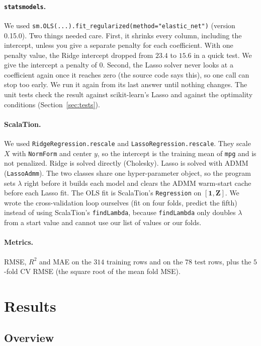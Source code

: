 \documentclass[11pt]{article}
\begin{document}
\paragraph{\texttt{statsmodels}.} We used \texttt{sm.OLS(...).fit\_regularized(method="elastic\_net")} (version 0.15.0). Two
things needed care. First, it shrinks every column, including the intercept, unless you give a separate penalty for each
coefficient. With one penalty value, the Ridge intercept dropped from $23.4$ to $15.6$ in a quick test. We give the intercept a penalty
of $0$. Second, the Lasso solver never looks at a coefficient again once it reaches zero (the source code says this), so one
call can stop too early. We run it again from its last answer until nothing changes. The unit tests check the result against
scikit-learn's Lasso and against the optimality conditions (Section~\ref{sec:tests}).

\paragraph{ScalaTion.} We used \texttt{RidgeRegression.rescale} and \texttt{LassoRegression.rescale}. They scale $X$ with
\texttt{NormForm} and center $y$, so the intercept is the training mean of \texttt{mpg} and is not penalized. Ridge is solved
directly (Cholesky). Lasso is solved with ADMM (\texttt{LassoAdmm}). The two classes share one hyper-parameter object, so the program
sets $\lambda$ right before it builds each model and clears the ADMM warm-start cache before each Lasso fit. The OLS fit is
ScalaTion's \texttt{Regression} on $[\mathbf 1,\mathbf Z]$. We wrote the cross-validation loop ourselves (fit on four folds,
predict the fifth) instead of using ScalaTion's \texttt{findLambda}, because \texttt{findLambda} only doubles $\lambda$ from a start
value and cannot use our list of values or our folds.

\paragraph{Metrics.} RMSE, $R^2$ and MAE on the $314$ training rows and on the $78$ test rows, plus the $5$-fold CV RMSE (the
square root of the mean fold MSE).

\section{Results}

\subsection{Overview}
\end{document}
